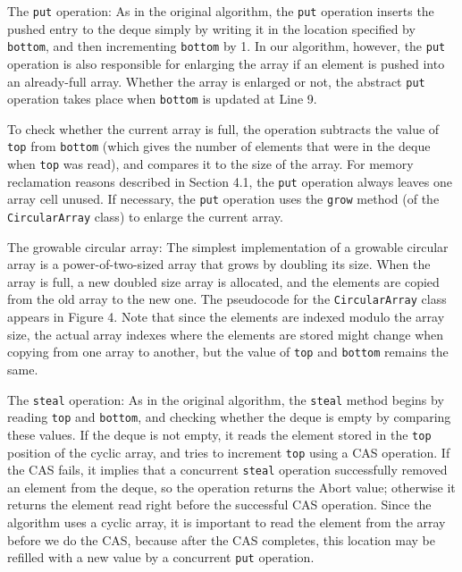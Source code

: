 The \lstinline!put! operation: As in the original algorithm, the
\lstinline!put! operation inserts the pushed entry to the deque simply
by writing it in the location specified by \lstinline!bottom!, and
then incrementing \lstinline!bottom! by 1. In our algorithm, however,
the \lstinline!put! operation is also responsible for enlarging the
array if an element is pushed into an already-full array. Whether the
array is enlarged or not, the abstract \lstinline!put! operation takes
place when \lstinline!bottom!  is updated at Line 9.

To check whether the current array is full, the operation subtracts
the value of \lstinline!top! from \lstinline!bottom! (which gives the
number of elements that were in the deque when \lstinline!top! was
read), and compares it to the size of the array. For memory
reclamation reasons described in Section 4.1, the \lstinline!put!
operation always leaves one array cell unused.  If necessary, the
\lstinline!put! operation uses the \lstinline!grow! method (of the
\lstinline!CircularArray! class) to enlarge the current array.

The growable circular array: The simplest implementation of a growable
circular array is a power-of-two-sized array that grows by doubling
its size. When the array is full, a new doubled size array is
allocated, and the elements are copied from the old array to the new
one. The pseudocode for the \lstinline!CircularArray! class appears in
Figure 4. Note that since the elements are indexed modulo the array
size, the actual array indexes where the elements are stored might
change when copying from one array to another, but the value of
\lstinline!top!  and \lstinline!bottom! remains the same.

The \lstinline!steal! operation: As in the original algorithm, the
\lstinline!steal! method begins by reading \lstinline!top! and
\lstinline!bottom!, and checking whether the deque is empty by
comparing these values. If the deque is not empty, it reads the
element stored in the \lstinline!top! position of the cyclic array,
and tries to increment \lstinline!top! using a CAS operation. If the
CAS fails, it implies that a concurrent \lstinline!steal! operation
successfully removed an element from the deque, so the operation
returns the Abort value; otherwise it returns the element read right
before the successful CAS operation. Since the algorithm uses a cyclic
array, it is important to read the element from the array before we do
the CAS, because after the CAS completes, this location may be
refilled with a new value by a concurrent \lstinline!put!  operation.

